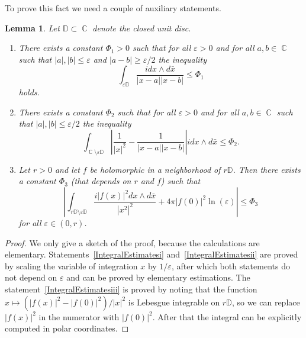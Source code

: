 \documentclass{amsart}
\numberwithin{equation}{section}
\newtheorem{lemma}[theorem]{Lemma}
\theoremstyle{definition}
\theoremstyle{remark}
\DeclareMathOperator{\CC}{\mathbb C}
\begin{document}
	To prove this fact we need a couple of auxiliary statements.
	\begin{lemma}\label{lemIntegralEstimates}
		Let $\mathbb D \subset \CC$ denote the closed unit disc.
		\begin{enumerate}[label=(\roman*)]
			\item\label{IntegralEstimatesi} There exists a constant $\Phi_1 > 0$ such that for all $\varepsilon > 0$ and for all $a, b \in \CC$ such that $|a|,|b| \le \varepsilon$ and $|a - b| \ge \varepsilon/2$ the inequality
			\[
			\int_{\varepsilon \mathbb D} \frac{idx \wedge d\bar{x}}{|x - a||x - b|} \le \Phi_1
			\]
			holds.
			\item\label{IntegralEstimatesii} There exists a constant $\Phi_2$ such that for all $\varepsilon > 0$ and for all $a,b \in \CC$ such that $|a|,|b| \le \varepsilon/2$ the inequality
			\[
			\int_{\CC \setminus \varepsilon\mathbb D} \left|\frac{1}{|x|^2} - \frac{1}{|x - a||x - b|}\right|idx \wedge d\bar{x} \le \Phi_2.
			\]
			\item\label{IntegralEstimatesiii} Let $r > 0$ and let $f$ be holomorphic in a neighborhood of $r\mathbb D$. Then there exists a constant $\Phi_3$ (that depends on $r$ and $f$) such that 
			\[
				\left|\int_{r\mathbb D \setminus \varepsilon \mathbb D} \dfrac{i|f(x)|^2dx \wedge d\bar{x}}{|x^2|^2} + 4\pi |f(0)|^2\ln(\varepsilon)\right| \le \Phi_3
			\]
			for all $\varepsilon \in (0, r)$.
		\end{enumerate}
	\end{lemma}
	\begin{proof}
		We only give a sketch of the proof, because the calculations are elementary. Statements~\ref{IntegralEstimatesi} and~\ref{IntegralEstimatesii} are proved by scaling the variable of integration $x$ by $1/\varepsilon$, after which both statements do not depend on $\varepsilon$ and can be proved by elementary estimations. The statement~\ref{IntegralEstimatesiii} is proved by noting that the function $x \mapsto (|f(x)|^2 - |f(0)|^2)/|x|^2$ is Lebesgue integrable on $r\mathbb D$, so we can replace $|f(x)|^2$ in the numerator with $|f(0)|^2$. After that the integral can be explicitly computed in polar coordinates.
	\end{proof}
\end{document}
